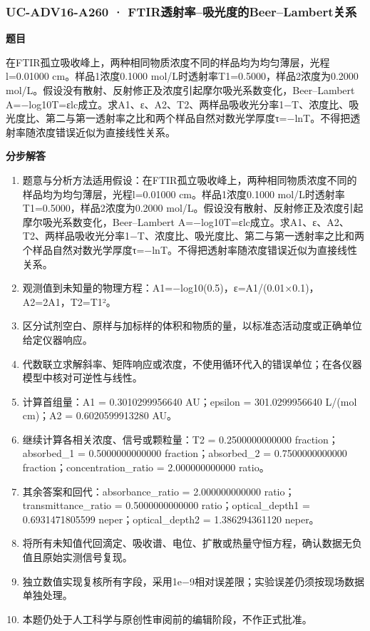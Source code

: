 \documentclass[UTF8,11pt,a4paper]{ctexart}
\begin{document}
\subsubsection*{UC-ADV16-A260 · FTIR透射率–吸光度的Beer–Lambert关系}
\noindent\textbf{题目}\par
在FTIR孤立吸收峰上，两种相同物质浓度不同的样品均为均匀薄层，光程l=0.01000 cm。样品1浓度0.1000 mol/L时透射率T1=0.5000，样品2浓度为0.2000 mol/L。假设没有散射、反射修正及浓度引起摩尔吸光系数变化，Beer–Lambert A=−log10T=εlc成立。求A1、ε、A2、T2、两样品吸收光分率1−T、浓度比、吸光度比、第二与第一透射率之比和两个样品自然对数光学厚度τ=−lnT。不得把透射率随浓度错误近似为直接线性关系。\par
\medskip\noindent\textbf{分步解答}
\begin{enumerate}
\item 题意与分析方法适用假设：在FTIR孤立吸收峰上，两种相同物质浓度不同的样品均为均匀薄层，光程l=0.01000 cm。样品1浓度0.1000 mol/L时透射率T1=0.5000，样品2浓度为0.2000 mol/L。假设没有散射、反射修正及浓度引起摩尔吸光系数变化，Beer–Lambert A=−log10T=εlc成立。求A1、ε、A2、T2、两样品吸收光分率1−T、浓度比、吸光度比、第二与第一透射率之比和两个样品自然对数光学厚度τ=−lnT。不得把透射率随浓度错误近似为直接线性关系。
\item 观测值到未知量的物理方程：A1=−log10(0.5)，ε=A1/(0.01×0.1)，A2=2A1，T2=T1²。
\item 区分试剂空白、原样与加标样的体积和物质的量，以标准态活动度或正确单位给定仪器响应。
\item 代数联立求解斜率、矩阵响应或浓度，不使用循环代入的错误单位；在各仪器模型中核对可逆性与线性。
\item 计算首组量：A1 = 0.3010299956640 AU；epsilon = 301.0299956640 L/(mol cm)；A2 = 0.6020599913280 AU。
\item 继续计算各相关浓度、信号或颗粒量：T2 = 0.2500000000000 fraction；absorbed\_1 = 0.5000000000000 fraction；absorbed\_2 = 0.7500000000000 fraction；concentration\_ratio = 2.000000000000 ratio。
\item 其余答案和回代：absorbance\_ratio = 2.000000000000 ratio；transmittance\_ratio = 0.5000000000000 ratio；optical\_depth1 = 0.6931471805599 neper；optical\_depth2 = 1.386294361120 neper。
\item 将所有未知值代回滴定、吸收谱、电位、扩散或热量守恒方程，确认数据无负值且原始实测信号复现。
\item 独立数值实现复核所有字段，采用1e−9相对误差限；实验误差仍须按现场数据单独处理。
\item 本题仍处于人工科学与原创性审阅前的编辑阶段，不作正式批准。
\end{enumerate}
\end{document}
